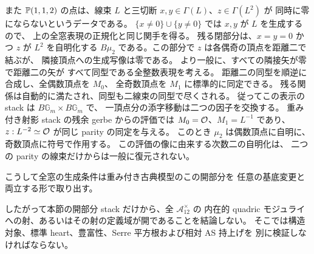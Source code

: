 また $\mathbb P(1,1,2)$ の点は、線束 $L$ と三切断
$x,y\in\Gamma(L)$、$z\in\Gamma(L^2)$ が
同時に零にならないというデータである。
$\{x\ne0\}\cup\{y\ne0\}$ では $x,y$ が $L$ を生成するので、
上の全窓表現の正規化と同じ関手を得る。
残る閉部分は、$x=y=0$ かつ $z$ が $L^2$ を自明化する
$B\mu_2$ である。この部分で $z$ は各偶奇の頂点を距離二で結ぶが、
隣接頂点への生成写像は零である。
より一般に、すべての隣接矢が零で距離二の矢が
すべて同型である全整数表現を考える。
距離二の同型を順逆に合成し、全偶数頂点を $M_0$、
全奇数頂点を $M_1$ に標準的に同定できる。
残る関係は自動的に満たされ、同型も二線束の同型で尽くされる。
従ってこの表示の stack は $B\mathbb G_m\times B\mathbb G_m$ で、
一頂点分の添字移動は二つの因子を交換する。
重み付き射影 stack の残余 gerbe からの評価では
$M_0=\mathcal O$、$M_1=L^{-1}$ であり、
$z:L^{-2}\simeq\mathcal O$ が同じ parity の同定を与える。
このとき $\mu_2$ は偶数頂点に自明に、奇数頂点に符号で作用する。
この評価の像に由来する次数二の自明化は、
二つの parity の線束だけからは一般に復元されない。

こうして全窓の生成条件は重み付き古典模型のこの開部分を
任意の基底変更と両立する形で取り出す。

したがって本節の開部分 stack だけから、全 $\mathcal A_{12}^{\times}$ の
内在的 quadric モジュライへの射、あるいはその射の定義域が開であることを結論しない。
そこでは構造対象、標準 heart、豊富性、Serre 平方根および相対 AS 持上げを
別に検証しなければならない。
